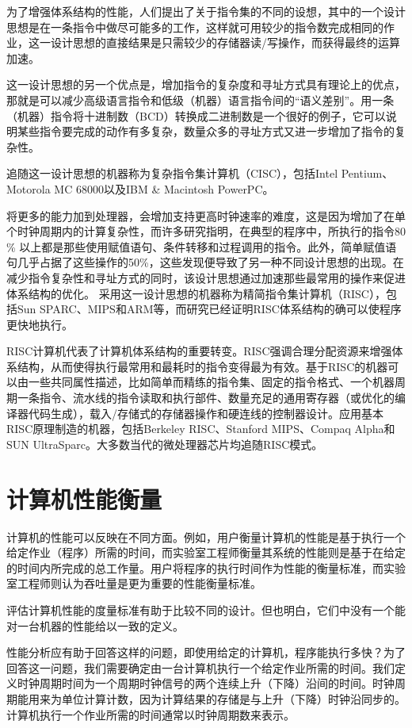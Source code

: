 为了增强体系结构的性能，人们提出了关于指令集的不同的设想，其中的一个设计思想是在一条指令中做尽可能多的工作，这样就可用较少的指令数完成相同的作业，这一设计思想的直接结果是只需较少的存储器读/写操作，而获得最终的运算加速。

这一设计思想的另一个优点是，增加指令的复杂度和寻址方式具有理论上的优点，那就是可以减少高级语言指令和低级（机器）语言指令间的“语义差别”。用一条（机器）指令将十进制数（BCD）转换成二进制数是一个很好的例子，它可以说明某些指令要完成的动作有多复杂，数量众多的寻址方式又进一步增加了指令的复杂性。

追随这一设计思想的机器称为复杂指令集计算机（CISC），包括Intel Pentium、Motorola MC 68000以及IBM \& Macintosh PowerPC。

将更多的能力加到处理器，会增加支持更高时钟速率的难度，这是因为增加了在单个时钟周期内的计算复杂性，而许多研究指明，在典型的程序中，所执行的指令80 \% 以上都是那些使用赋值语句、条件转移和过程调用的指令。此外，简单赋值语句几乎占据了这些操作的50\%，这些发现便导致了另一种不同设计思想的出现。在减少指令复杂性和寻址方式的同时，该设计思想通过加速那些最常用的操作来促进体系结构的优化。
采用这一设计思想的机器称为精简指令集计算机（RISC），包括Sun SPARC、MIPS和ARM等，而研究已经证明RISC体系结构的确可以使程序更快地执行。

RISC计算机代表了计算机体系结构的重要转变。RISC强调合理分配资源来增强体系结构，从而使得执行最常用和最耗时的指令变得最为有效。基于RISC的机器可以由一些共同属性描述，比如简单而精练的指令集、固定的指令格式、一个机器周期一条指令、流水线的指令读取和执行部件、数量充足的通用寄存器（或优化的编译器代码生成），载入/存储式的存储器操作和硬连线的控制器设计。应用基本RISC原理制造的机器，包括Berkeley RISC、Stanford MIPS、Compaq Alpha和SUN UltraSparc。大多数当代的微处理器芯片均追随RISC模式。

\chapter{计算机性能衡量}

计算机的性能可以反映在不同方面。例如，用户衡量计算机的性能是基于执行一个给定作业（程序）所需的时间，而实验室工程师衡量其系统的性能则是基于在给定的时间内所完成的总工作量。用户将程序的执行时间作为性能的衡量标准，而实验室工程师则认为吞吐量是更为重要的性能衡量标准。

评估计算机性能的度量标准有助于比较不同的设计。但也明白，它们中没有一个能对一台机器的性能给以一致的定义。

性能分析应有助于回答这样的问题，即使用给定的计算机，程序能执行多快？为了回答这一问题，我们需要确定由一台计算机执行一个给定作业所需的时间。我们定义时钟周期时间为一个周期时钟信号的两个连续上升（下降）沿间的时间。时钟周期能用来为单位计算计数，因为计算结果的存储是与上升（下降）时钟沿同步的。计算机执行一个作业所需的时间通常以时钟周期数来表示。

